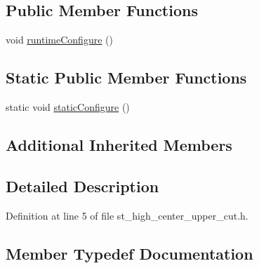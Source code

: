 \subsection*{Public Member Functions}
\begin{DoxyCompactItemize}
\item 
void \hyperlink{structsm__moveit__3_1_1StHighCenterUpperCut_abf028817092539f6ba633e750d322bf0}{runtime\+Configure} ()
\end{DoxyCompactItemize}
\subsection*{Static Public Member Functions}
\begin{DoxyCompactItemize}
\item 
static void \hyperlink{structsm__moveit__3_1_1StHighCenterUpperCut_a4f9ebb013b2961fed72fef061e2578d8}{static\+Configure} ()
\end{DoxyCompactItemize}
\subsection*{Additional Inherited Members}


\subsection{Detailed Description}


Definition at line 5 of file st\+\_\+high\+\_\+center\+\_\+upper\+\_\+cut.\+h.



\subsection{Member Typedef Documentation}
\mbox{\label{structsm__moveit__3_1_1StHighCenterUpperCut_a4985c365500d6acc2991ecf20c4476e7}} 
